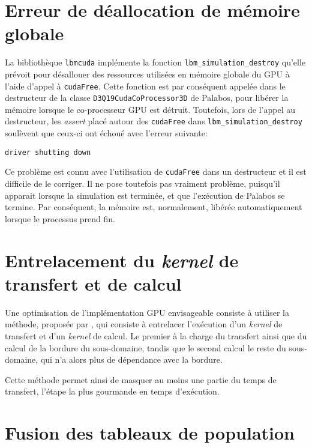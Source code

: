 \section{Erreur de déallocation de mémoire globale}

La bibliothèque \texttt{lbmcuda} implémente la fonction \texttt{lbm\_simulation\_destroy} qu'elle prévoit pour désallouer des ressources utilisées en mémoire globale du \acs{GPU} à l'aide d'appel à \texttt{cudaFree}. Cette fonction est par conséquent appelée dans le destructeur de la classe \texttt{D3Q19CudaCoProcessor3D} de Palabos, pour libérer la mémoire lorsque le co-processeur \acs{GPU} est détruit. Toutefois, lors de l'appel au destructeur, les \textit{assert} placé autour des \texttt{cudaFree} dans \texttt{lbm\_simulation\_destroy} soulèvent que ceux-ci ont échoué avec l'erreur suivante:

\begin{center}
\texttt{driver shutting down}
\end{center}

\noindent Ce problème est connu avec l'utilisation de \texttt{cudaFree} dans un destructeur \cite{ZZZweb_stack_2018, ZZZweb_stack_2018-1} et il est difficile de le corriger. Il ne pose toutefois pas vraiment problème, puisqu'il apparait lorsque la simulation est terminée, et que l'exécution de Palabos se termine. Par conséquent, la mémoire est, normalement, libérée automatiquement lorsque le processus prend fin.

\section{Entrelacement du \textit{kernel} de transfert et de calcul}
Une optimisation de l'implémentation \acs{GPU} envisageable consiste à utiliser la méthode, proposée par \citet{feichtinger_performance_2015}, qui consiste à entrelacer l'exécution d'un \textit{kernel} de transfert et d'un \textit{kernel} de calcul. Le premier à la charge du transfert ainsi que du calcul de la bordure du sous-domaine, tandis que le second calcul le reste du sous-domaine, qui n'a alors plus de dépendance avec la bordure.

Cette méthode permet ainsi de masquer au moins une partie du temps de transfert, l'étape la plus gourmande en temps d'exécution. 

\section{Fusion des tableaux de population}

